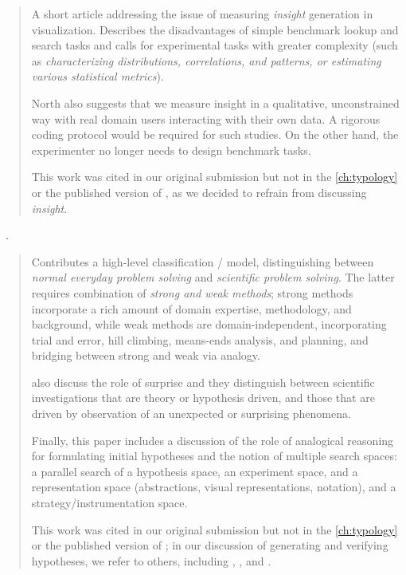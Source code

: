 \begin{quotation}
    A short article addressing the issue of measuring {\it insight} generation in visualization. 
    Describes the disadvantages of simple benchmark lookup and search tasks and calls for experimental tasks with greater complexity (such as {\it characterizing distributions, correlations, and patterns, or estimating various statistical metrics}).
    
    North also suggests that we measure insight in a qualitative, unconstrained way with real domain users interacting with their own data.
    A rigorous coding protocol would be required for such studies.
    On the other hand, the experimenter no longer needs to design benchmark tasks. 
    
    This work was cited in our original submission but not in the \autoref{ch:typology} or the published version of \citet{Brehmer2013}, as we decided to refrain from discussing {\it insight}.
\end{quotation}

\begin{sloppypar}
~\cite{Klahr1999}. \end{sloppypar}

\begin{quotation}
    \begin{sloppypar}
    Contributes a high-level classification / model, distinguishing between {\it normal everyday problem solving} and {\it scientific problem solving}. 
    The latter requires combination of {\it strong and weak methods}; strong methods incorporate a rich amount of domain expertise, methodology, and background, while weak methods are domain-independent, incorporating trial and error, hill climbing, means-ends analysis, and planning, and bridging between strong and weak via analogy. 
    \end{sloppypar}
    
    \citet{Klahr1999} also discuss the role of surprise and they distinguish between scientific investigations that are theory or hypothesis driven, and those that are driven by observation of an unexpected or surprising phenomena.

    Finally, this paper includes a discussion of the role of analogical reasoning for formulating initial hypotheses and the notion of multiple search spaces: a parallel search of a hypothesis space, an experiment space, and a representation space (abstractions, visual representations, notation), and a strategy/instrumentation space.
    
    This work was cited in our original submission but not in the  \autoref{ch:typology} or the published version of \citet{Brehmer2013}; in our discussion of generating and verifying hypotheses, we refer to others, including \citet{Andre2009}, \citet{Pike2009}, and \citet{Tukey1977}.
\end{quotation}

